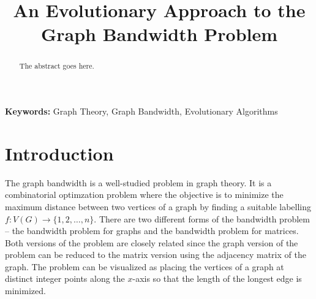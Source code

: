 \documentclass[conference,compsoc]{IEEEtran}
\begin{document}
\title{An Evolutionary Approach to the Graph Bandwidth Problem}
\author{
\and
{}
\and
{}
}

\maketitle

\begin{abstract}
The abstract goes here.
\end{abstract}
\textbf{Keywords:} Graph Theory, Graph Bandwidth, Evolutionary Algorithms

\IEEEpeerreviewmaketitle

\section{Introduction} \label{intro}
The graph bandwidth is a well-studied problem in graph theory. It is a combinatorial optimzation problem where the objective 
is to minimize the maximum distance between two vertices of a graph by finding a suitable labelling $f: V(G) \to \{1, 2, \dots, n\}$.
There are two different forms of the bandwidth problem -- the bandwidth problem for graphs and the bandwidth problem for matrices. 
Both versions of the problem are closely related since the graph version of the problem can be reduced to the matrix version using 
the adjacency matrix of the graph. 
The problem can be visualized as placing the vertices of a graph at distinct integer points along the $x$-axis so that the 
length of the longest edge is minimized. 
\end{document}

